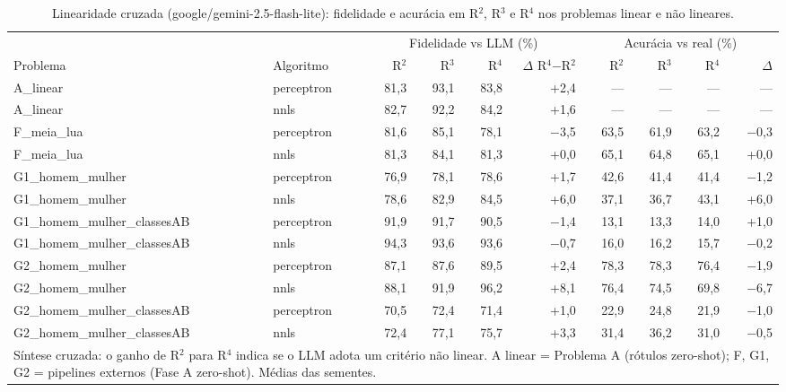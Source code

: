 \begin{table}[htbp]
\centering
\small
\caption{Linearidade cruzada (google/gemini-2.5-flash-lite): fidelidade e acurácia em R$^2$, R$^3$ e R$^4$ nos problemas linear e não lineares.}
\label{tab:final_linearidade_cruzada_R2_R3_R4_flashlite}
\begin{tabular}{llrrrrrrrr}
\toprule
 &  & \multicolumn{4}{c}{Fidelidade vs LLM (\%)} & \multicolumn{4}{c}{Acurácia vs real (\%)} \\ \cmidrule(lr){3-6} \cmidrule(lr){7-10}
Problema & Algoritmo & R$^2$ & R$^3$ & R$^4$ & $\Delta$ R$^4$$-$R$^2$ & R$^2$ & R$^3$ & R$^4$ & $\Delta$ \\
\midrule
A\_linear & perceptron & 81,3 & 93,1 & 83,8 & +2,4 & — & — & — & — \\
A\_linear & nnls & 82,7 & 92,2 & 84,2 & +1,6 & — & — & — & — \\
\midrule
F\_meia\_lua & perceptron & 81,6 & 85,1 & 78,1 & $-$3,5 & 63,5 & 61,9 & 63,2 & $-$0,3 \\
F\_meia\_lua & nnls & 81,3 & 84,1 & 81,3 & +0,0 & 65,1 & 64,8 & 65,1 & +0,0 \\
\midrule
G1\_homem\_mulher & perceptron & 76,9 & 78,1 & 78,6 & +1,7 & 42,6 & 41,4 & 41,4 & $-$1,2 \\
G1\_homem\_mulher & nnls & 78,6 & 82,9 & 84,5 & +6,0 & 37,1 & 36,7 & 43,1 & +6,0 \\
\midrule
G1\_homem\_mulher\_classesAB & perceptron & 91,9 & 91,7 & 90,5 & $-$1,4 & 13,1 & 13,3 & 14,0 & +1,0 \\
G1\_homem\_mulher\_classesAB & nnls & 94,3 & 93,6 & 93,6 & $-$0,7 & 16,0 & 16,2 & 15,7 & $-$0,2 \\
\midrule
G2\_homem\_mulher & perceptron & 87,1 & 87,6 & 89,5 & +2,4 & 78,3 & 78,3 & 76,4 & $-$1,9 \\
G2\_homem\_mulher & nnls & 88,1 & 91,9 & 96,2 & +8,1 & 76,4 & 74,5 & 69,8 & $-$6,7 \\
\midrule
G2\_homem\_mulher\_classesAB & perceptron & 70,5 & 72,4 & 71,4 & +1,0 & 22,9 & 24,8 & 21,9 & $-$1,0 \\
G2\_homem\_mulher\_classesAB & nnls & 72,4 & 77,1 & 75,7 & +3,3 & 31,4 & 36,2 & 31,0 & $-$0,5 \\
\bottomrule
\multicolumn{10}{p{0.95\linewidth}}{\footnotesize Síntese cruzada: o ganho de R$^2$ para R$^4$ indica se o LLM adota um critério não linear. A linear = Problema A (rótulos zero-shot); F, G1, G2 = pipelines externos (Fase A zero-shot). Médias das sementes.} \\
\end{tabular}
\end{table}
